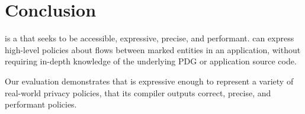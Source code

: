 \chapter{Conclusion}

\syslang{} is a \policylang{} that seeks to be accessible, expressive, precise, and performant.
%
\Ces{} can express high-level policies about flows between marked entities in an application,
without requiring in-depth knowledge of the underlying PDG or application source code.

Our evaluation demonstrates that \syslang{} is expressive enough to represent a variety of real-world privacy policies,
that its compiler outputs correct, precise, and performant policies.
